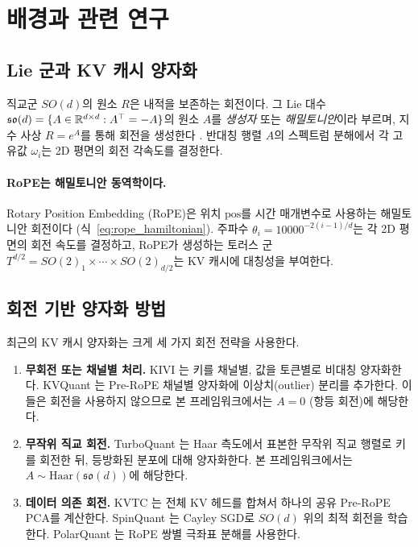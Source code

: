 \section{배경과 관련 연구}
\label{sec:background}

\subsection{Lie 군과 KV 캐시 양자화}

직교군 $SO(d)$의 원소 $R$은 내적을 보존하는 회전이다. 그 Lie 대수 $\mathfrak{so}(d) = \{A \in \mathbb{R}^{d \times d} : A^\top = -A\}$의 원소 $A$를 \emph{생성자} 또는 \emph{해밀토니안}이라 부르며, 지수 사상 $R = e^A$를 통해 회전을 생성한다 \citep{hall2015lie}. 반대칭 행렬 $A$의 스펙트럼 분해에서 각 고유값 $\omega_i$는 2D 평면의 회전 각속도를 결정한다.

\paragraph{RoPE는 해밀토니안 동역학이다.}
Rotary Position Embedding (RoPE)은 위치 $\mathrm{pos}$를 시간 매개변수로 사용하는 해밀토니안 회전이다 (식~\ref{eq:rope_hamiltonian}). 주파수 $\theta_i = 10000^{-2(i-1)/d}$는 각 2D 평면의 회전 속도를 결정하고, RoPE가 생성하는 토러스 군 $T^{d/2} = SO(2)_1 \times \cdots \times SO(2)_{d/2}$는 KV 캐시에 대칭성을 부여한다.

\subsection{회전 기반 양자화 방법}

최근의 KV 캐시 양자화는 크게 세 가지 회전 전략을 사용한다.

\begin{enumerate}[leftmargin=1.5em,itemsep=2pt]
\item \textbf{무회전 또는 채널별 처리.} KIVI \citep{liu2024kivi}는 키를 채널별, 값을 토큰별로 비대칭 양자화한다. KVQuant \citep{hooper2024kvquant}는 Pre-RoPE 채널별 양자화에 이상치(outlier) 분리를 추가한다. 이들은 회전을 사용하지 않으므로 본 프레임워크에서는 $A=0$ (항등 회전)에 해당한다.

\item \textbf{무작위 직교 회전.} TurboQuant \citep{zandieh2025turboquant}는 Haar 측도에서 표본한 무작위 직교 행렬로 키를 회전한 뒤, 등방화된 분포에 대해 양자화한다. 본 프레임워크에서는 $A \sim \mathrm{Haar}(\mathfrak{so}(d))$에 해당한다.

\item \textbf{데이터 의존 회전.} KVTC \citep{staniszewski2025kvtc}는 전체 KV 헤드를 합쳐서 하나의 공유 Pre-RoPE PCA를 계산한다. SpinQuant \citep{liu2024spinquant}는 Cayley SGD로 $SO(d)$ 위의 최적 회전을 학습한다. PolarQuant \citep{wu2025polarquant}는 RoPE 쌍별 극좌표 분해를 사용한다.
\end{enumerate}

